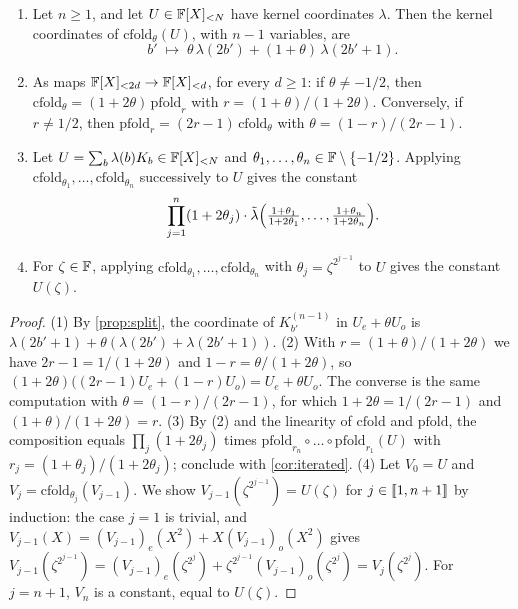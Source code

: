 \begin{proposition}\label{prop:classical}
\begin{enumerate}
  \item Let $n \ge 1$, and let $U \in \mathbb{F}[X]_{<N}$ have kernel coordinates $\lambda$. Then the kernel coordinates of $\mathrm{cfold}_\theta(U)$, with $n-1$ variables, are
  \[
    b' \;\longmapsto\; \theta\,\lambda(2b') + (1+\theta)\,\lambda(2b'+1).
  \]
  \item As maps $\mathbb{F}[X]_{<2d} \to \mathbb{F}[X]_{<d}$, for every $d \ge 1$: if $\theta \ne -1/2$, then $\mathrm{cfold}_\theta = (1+2\theta)\,\mathrm{pfold}_{r}$ with $r = (1+\theta)/(1+2\theta)$. Conversely, if $r \ne 1/2$, then $\mathrm{pfold}_r = (2r-1)\,\mathrm{cfold}_{\theta}$ with $\theta = (1-r)/(2r-1)$.
  \item Let $U = \sum_b \lambda(b) K_b \in \mathbb{F}[X]_{<N}$ and $\theta_1,\dots,\theta_n \in \mathbb{F} \setminus \{-1/2\}$. Applying $\mathrm{cfold}_{\theta_1},\dots,\mathrm{cfold}_{\theta_n}$ successively to $U$ gives the constant
  \[
    \prod_{j=1}^{n} (1+2\theta_j) \cdot \tilde\lambda\Bigl( \tfrac{1+\theta_1}{1+2\theta_1}, \dots, \tfrac{1+\theta_n}{1+2\theta_n} \Bigr).
  \]
  \item For $\zeta \in \mathbb{F}$, applying $\mathrm{cfold}_{\theta_1},\dots,\mathrm{cfold}_{\theta_n}$ with $\theta_j = \zeta^{2^{j-1}}$ to $U$ gives the constant $U(\zeta)$.
\end{enumerate}
\end{proposition}

\begin{proof}
(1) By \cref{prop:split}, the coordinate of $K^{(n-1)}_{b'}$ in $U_e + \theta U_o$ is $\lambda(2b'+1) + \theta(\lambda(2b') + \lambda(2b'+1))$.
(2) With $r = (1+\theta)/(1+2\theta)$ we have $2r - 1 = 1/(1+2\theta)$ and $1 - r = \theta/(1+2\theta)$, so $(1+2\theta)\bigl((2r-1)U_e + (1-r)U_o\bigr) = U_e + \theta U_o$. The converse is the same computation with $\theta = (1-r)/(2r-1)$, for which $1+2\theta = 1/(2r-1)$ and $(1+\theta)/(1+2\theta) = r$.
(3) By (2) and the linearity of $\mathrm{cfold}$ and $\mathrm{pfold}$, the composition equals $\prod_j (1+2\theta_j)$ times $\mathrm{pfold}_{r_n} \circ \dots \circ \mathrm{pfold}_{r_1}(U)$ with $r_j = (1+\theta_j)/(1+2\theta_j)$; conclude with \cref{cor:iterated}.
(4) Let $V_0 = U$ and $V_j = \mathrm{cfold}_{\theta_j}(V_{j-1})$. We show $V_{j-1}(\zeta^{2^{j-1}}) = U(\zeta)$ for $j \in \llbracket 1, n+1 \rrbracket$ by induction: the case $j = 1$ is trivial, and $V_{j-1}(X) = (V_{j-1})_e(X^2) + X(V_{j-1})_o(X^2)$ gives $V_{j-1}(\zeta^{2^{j-1}}) = (V_{j-1})_e(\zeta^{2^j}) + \zeta^{2^{j-1}}(V_{j-1})_o(\zeta^{2^j}) = V_j(\zeta^{2^j})$. For $j = n+1$, $V_n$ is a constant, equal to $U(\zeta)$.
\end{proof}

